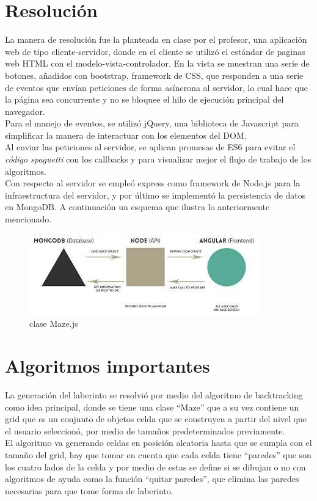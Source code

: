 \documentclass[11pt]{article}
\begin{document}
\section{Resolución}
La manera de resolución fue la planteada en clase por el profesor, una aplicación web de tipo cliente-servidor, donde en el cliente se utilizó el estándar de paginas web HTML con el modelo-vista-controlador. En la vista se muestran una serie de botones, añadidos con bootstrap, framework de CSS, que responden a una serie de eventos que envían peticiones de forma asíncrona al servidor, lo cual hace que la página sea concurrente y no se bloquee el hilo de ejecución principal del navegador. \\
	Para el manejo de eventos, se utilizó jQuery, una biblioteca de Javascript para simplificar la manera de interactuar con los elementos del DOM.\\
	Al enviar las peticiones al servidor, se aplican promesas de ES6 para evitar el \textit{código spaguetti} con los callbacks y para visualizar mejor el flujo de trabajo de los algoritmos.\\
	Con respecto al servidor se empleó express como framework de Node.js para la infraestructura del servidor, y por último se implementó la persistencia de datos en MongoDB. A continuación un esquema que ilustra lo anteriormente mencionado.\\

\begin{figure}[H] 
\includegraphics[scale=1.0]{mongo}
\centering
\caption{clase Maze.js}
\end{figure}

\section{Algoritmos importantes}
La generación del laberinto se resolvió por medio del algoritmo de backtracking como idea principal, donde se tiene una clase “Maze” que a su vez  contiene un grid que es un conjunto de objetos celda que se construyen a partir del nivel que el usuario seleccionó, por medio de tamaños predeterminados previamente. \\
	El algoritmo va  generando celdas en posición aleatoria hasta que se cumpla con el tamaño del grid, hay que tomar en cuenta que cada celda tiene “paredes” que son los cuatro lados de la celda y por medio de estas se define si se dibujan o no con algoritmos de ayuda como la función “quitar paredes”, que elimina las paredes necesarias para que tome forma de laberinto.\\
\end{document}
